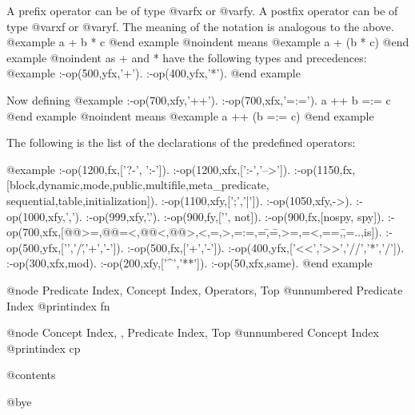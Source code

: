  A prefix operator can be of type @var{fx} or @var{fy}. 
A postfix operator can be of type @var{xf} or @var{yf}. 
The meaning of the notation is analogous to the above.
@example
a + b * c
@end example
@noindent
means
@example
a + (b * c)
@end example
@noindent
as + and * have the following types and precedences:
@example
:-op(500,yfx,'+').
:-op(400,yfx,'*').
@end example

Now defining
@example
:-op(700,xfy,'++').
:-op(700,xfx,'=:=').
a ++ b =:= c
@end example
@noindent means
@example  
a ++ (b =:= c)
@end example
 

The following is the list of the declarations of the predefined operators:

@example
:-op(1200,fx,['?-', ':-']).
:-op(1200,xfx,[':-','-->']).
:-op(1150,fx,[block,dynamic,mode,public,multifile,meta_predicate,
              sequential,table,initialization]).
:-op(1100,xfy,[';','|']).
:-op(1050,xfy,->).
:-op(1000,xfy,',').
:-op(999,xfy,'.').
:-op(900,fy,['\+', not]).
:-op(900,fx,[nospy, spy]).
:-op(700,xfx,[@@>=,@@=<,@@<,@@>,<,=,>,=:=,=\=,\==,>=,=<,==,\=,=..,is]).
:-op(500,yfx,['\/','/\','+','-']).
:-op(500,fx,['+','-']).
:-op(400,yfx,['<<','>>','//','*','/']).
:-op(300,xfx,mod).
:-op(200,xfy,['^','**']).
:-op(50,xfx,same).
@end example

@node Predicate Index, Concept Index, Operators, Top
@unnumbered Predicate Index
@printindex fn

@node Concept Index, , Predicate Index, Top
@unnumbered Concept Index
@printindex cp

@contents

@bye
